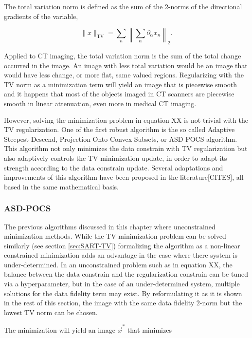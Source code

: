 The total variation norm is defined as the sum of the 2-norms of the directional gradients of the variable,

\begin{equation}
\lVert x \rVert_\text{TV}=\sum_n\left\lVert \sum_\alpha\partial_\alpha x_n \right\rVert_2.
\end{equation}

Applied to CT imaging, the total variation norm is the sum of the total change occurred in the image. An image with less total variation would be an image that would have less change, or more flat, same valued regions. Regularizing with the TV norm as a minimization term will yield an image that is piecewise smooth and it happens that most of the objects imaged in CT scanners are piecewise smooth in linear attenuation, even more in medical CT imaging. 

However, solving the minimization problem in equation XX is not trivial with the TV regularization. One of the first robust algorithm is the so called Adaptive Steepest Descend, Projection Onto Convex Subsets, or ASD-POCS algorithm\cite{ASD_POCS}. This algorithm not only minimizes the data constrain with TV regularization but also adaptively controls the TV minimization update, in order to adapt its strength according to the data constrain update. Several adaptations and improvements of this algorithm have been proposed in the literature[CITES], all based in the same mathematical basis.  


\subsubsection{ASD-POCS}

The previous algorithms discussed in this chapter where unconstrained minimization methods. While the TV minimization problem can be solved similarly (see section \ref{sec:SART-TV}) formalizing the algorithm as a non-linear constrained minimization adds an advantage in the case where there system is under-determined. In an unconstrained problem such as in equation XX, the balance between the data constrain and the regularization constrain can be tuned via a hyperparameter, but in the case of an under-determined system, multiple solutions for the data fidelity term may exist. By reformulating it as it is shown in the rest of this section, the image with the same data fidelity 2-norm but the lowest TV norm can be chosen.

The minimization will yield an image $\vec{x}^*$ that minimizes 

